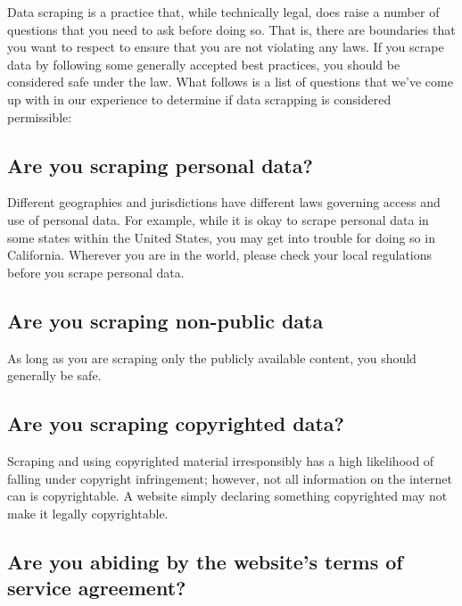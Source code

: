 \documentclass[
]{book}
\begin{document}
Data scraping is a practice that, while technically legal, does raise a number of questions that you need to ask before doing so. That is, there are boundaries that you want to respect to ensure that you are not violating any laws. If you scrape data by following some generally accepted best practices, you should be considered safe under the law. What follows is a list of questions that we've come up with in our experience to determine if data scrapping is considered permissible:

\hypertarget{are-you-scraping-personal-data}{%
\subsection*{Are you scraping personal data?}\label{are-you-scraping-personal-data}}


Different geographies and jurisdictions have different laws governing access and use of personal data. For example, while it is okay to scrape personal data in some states within the United States, you may get into trouble for doing so in California. Wherever you are in the world, please check your local regulations before you scrape personal data.

\hypertarget{are-you-scraping-non-public-data}{%
\subsection*{Are you scraping non-public data}\label{are-you-scraping-non-public-data}}


As long as you are scraping only the publicly available content, you should generally be safe.

\hypertarget{are-you-scraping-copyrighted-data}{%
\subsection*{Are you scraping copyrighted data?}\label{are-you-scraping-copyrighted-data}}


Scraping and using copyrighted material irresponsibly has a high likelihood of falling under copyright infringement; however, not all information on the internet can is copyrightable. A website simply declaring something copyrighted may not make it legally copyrightable.

\hypertarget{are-you-abiding-by-the-websites-terms-of-service-agreement}{%
\subsection*{Are you abiding by the website's terms of service agreement?}\label{are-you-abiding-by-the-websites-terms-of-service-agreement}}
\end{document}
